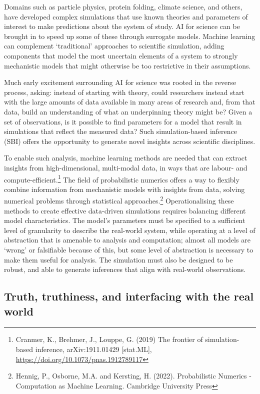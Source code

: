 {Domains such as particle physics, protein folding, climate science, and
others, have developed complex simulations that use known theories and
parameters of interest to make predictions about the system of study. AI
for science can be brought in to speed up some of these through
surrogate models. Machine learning can complement `traditional'
approaches to scientific simulation, adding components that model the
most uncertain elements of a system to strongly mechanistic models that
might otherwise be too restrictive in their assumptions.

Much early excitement surrounding AI for science was rooted in the
reverse process, asking: instead of starting with theory, could
researchers instead start with the large amounts of data available in
many areas of research and, from that data, build an understanding of
what an underpinning theory might be? Given a set of observations, is it
possible to find parameters for a model that result in simulations that
reflect the measured data? Such simulation-based inference (SBI) offers
the opportunity to generate novel insights across scientific
disciplines.

To enable such analysis, machine learning methods are needed that can
extract insights from high-dimensional, multi-modal data, in ways that
are labour- and compute-efficient.\footnote{Cranmer, K., Brehmer, J.,
  Louppe, G. (2019) The frontier of simulation-based inference,
  arXiv:1911.01429 {[}stat.ML{]},
  \url{https://doi.org/10.1073/pnas.1912789117}} The field of
probabilistic numerics offers a way to flexibly combine information from
mechanistic models with insights from data, solving numerical problems
through statistical approaches.\footnote{Hennig, P., Osborne, M.A. and
  Kersting, H. (2022). Probabilistic Numerics - Computation as Machine
  Learning. Cambridge University Press} Operationalising these methods
to create effective data-driven simulations requires balancing different
model characteristics. The model's parameters must be specified to a
sufficient level of granularity to describe the real-world system, while
operating at a level of abstraction that is amenable to analysis and
computation; almost all models are `wrong' or falsifiable because of
this, but some level of abstraction is necessary to make them useful for
analysis. The simulation must also be designed to be robust, and able to
generate inferences that align with real-world observations.

\hypertarget{truth-truthiness-and-interfacing-with-the-real-world}{%
\subsection{Truth, truthiness, and interfacing with the real
world}\label{truth-truthiness-and-interfacing-with-the-real-world}}

}
